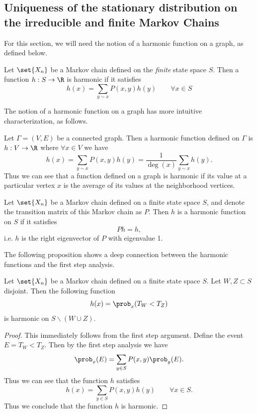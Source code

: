 \subsection{Uniqueness of the stationary distribution on the irreducible and finite Markov Chains }

For this section, we will need the notion of a harmonic function on a graph, as defined below.
\begin{definition}
	Let $ \set{X_n} $ be a Markov chain defined on the \emph{finite} state space $ S $. Then a function $ h: S \to \R $ is harmonic if it satisfies
	\[ h(x) = \sum_{y\sim x} P(x,y)h(y) \qquad \forall x\in S \]
\end{definition}
The notion of a harmonic function on a graph has more intuitive characterization, as follows.

\begin{observation}
	Let $ \Gamma = (V,E) $ be a connected graph. Then a harmonic function defined on $ \Gamma $ is $ h: V \to \R $ where $ \forall x \in V $ we have
	\[ h(x) = \sum_{y \sim x} P(x,y)h(y) = \frac{1}{\deg(x)} \sum_{y\sim x}h(y). \]
	Thus we can see that a function defined on a graph is harmonic if its value at a particular vertex $ x $ is the average of its values at the neighborhood vertices.  
\end{observation}

\begin{lemma}
	Let $ \set{X_n} $ be a Markov chain defined on a finite state space $ S $, and denote the transition  matrix of this Markov chain as $ P $. Then $ h $ is a harmonic function on $ S $ if it satisfies
	\[ Ph = h, \]
	i.e. $ h $ is the right eigenvector of $ P $ with eigenvalue 1. 
\end{lemma}

The following proposition shows a deep connection between the harmonic functions and the first step analysis. 

\begin{proposition}
	Let $ \set{X_n} $ be a Markov chain defined on a finite state space $ S $. Let $ W,Z \subset S $ disjoint. Then the following function
	\[ h(x) = \prob_x(T_W < T_Z) \]
	is harmonic on $ S \backslash (W \cup Z) $.
\end{proposition}
\begin{proof}
	This immediately follows from the first step argument. Define the event $ E = T_W < T_Z $. Then by the first step analysis we have
	\[ \prob_x(E) = \sum_{y\in S} P(x,y) \prob_y(E). \]
	Thus we can see that the function $ h $ satisfies
	\[ h(x) = \sum_{y \in S} P(x,y)h(y) \qquad \forall x\in S. \]
	Thus we conclude that the function $ h $ is harmonic. 
\end{proof}